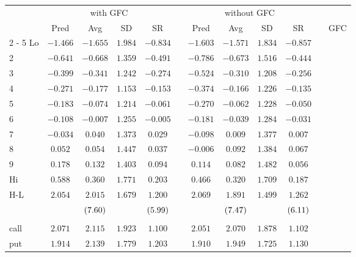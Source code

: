\begin{tabular}{@{}lccccccccccc@{}}%
\toprule%
&\multicolumn{4}{c}{with GFC}&&\multicolumn{4}{c}{without GFC}&&\\%
\multicolumn{1}{c}{}&\multicolumn{1}{c}{Pred}&\multicolumn{1}{c}{Avg}&\multicolumn{1}{c}{SD}&\multicolumn{1}{c}{SR}&\multicolumn{1}{c}{}&\multicolumn{1}{c}{Pred}&\multicolumn{1}{c}{Avg}&\multicolumn{1}{c}{SD}&\multicolumn{1}{c}{SR}&\multicolumn{1}{c}{}&\multicolumn{1}{c}{GFC}\\%
\cmidrule{2%
-%
5}%
\cmidrule{7%
-%
10}%
\cmidrule{12%
-%
12}%
Lo&$-1.466$&$-1.655$&$1.984$&$-0.834$&&$-1.603$&$-1.571$&$1.834$&$-0.857$&&\\%
2&$-0.641$&$-0.668$&$1.359$&$-0.491$&&$-0.786$&$-0.673$&$1.516$&$-0.444$&&\\%
3&$-0.399$&$-0.341$&$1.242$&$-0.274$&&$-0.524$&$-0.310$&$1.208$&$-0.256$&&\\%
4&$-0.271$&$-0.177$&$1.153$&$-0.153$&&$-0.374$&$-0.166$&$1.226$&$-0.135$&&\\%
5&$-0.183$&$-0.074$&$1.214$&$-0.061$&&$-0.270$&$-0.062$&$1.228$&$-0.050$&&\\%
6&$-0.108$&$-0.007$&$1.255$&$-0.005$&&$-0.181$&$-0.039$&$1.284$&$-0.031$&&\\%
7&$-0.034$&$0.040$&$1.373$&$0.029$&&$-0.098$&$0.009$&$1.377$&$0.007$&&\\%
8&$0.052$&$0.054$&$1.447$&$0.037$&&$-0.006$&$0.092$&$1.384$&$0.067$&&\\%
9&$0.178$&$0.132$&$1.403$&$0.094$&&$0.114$&$0.082$&$1.482$&$0.056$&&\\%
Hi&$0.588$&$0.360$&$1.771$&$0.203$&&$0.466$&$0.320$&$1.709$&$0.187$&&\\%
\midrule%
H{-}L&$2.054$&$2.015$&$1.679$&$1.200$&&$2.069$&$1.891$&$1.499$&$1.262$&&\\%
&&$\footnotesize{(7.60)}$&&$\footnotesize{(5.99)}$&&&$\footnotesize{(7.47)}$&&$\footnotesize{(6.11)}$&&\\%
&&&&&&&&&&&\\%
call&$2.071$&$2.115$&$1.923$&$1.100$&&$2.051$&$2.070$&$1.878$&$1.102$&&\\%
put&$1.914$&$2.139$&$1.779$&$1.203$&&$1.910$&$1.949$&$1.725$&$1.130$&&\\\bottomrule%
%
\end{tabular}